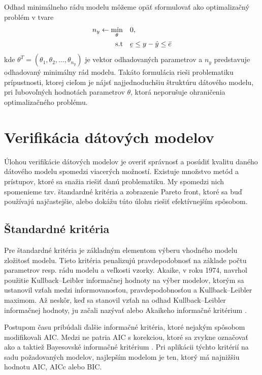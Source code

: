 Odhad minimálneho rádu modelu môžeme opäť sformulovať ako optimalizačný problém v tvare
\begin{equation}
	\begin{split}
		n_y \leftarrow \min_{\theta} & \quad 0, \\
		\text{s.t} & \quad \ubar{e} \leq y - \hat{y} \leq \bar{e}
	\end{split}
\end{equation}
kde $ \theta^T = (\theta_1, \theta_2, \dots, \theta_{n_y}) $ je vektor odhadovaných parametrov a $ n_y $ predstavuje odhadovaný minimálny rád modelu. Takáto formulácia rieši problematiku prípustnosti, ktorej cieľom je nájsť najjednoduchšiu štruktúru dátového modelu, pri ľubovoľných hodnotách parametrov $ \theta $, ktorá neporušuje ohraničenia optimalizačného problému.  

\section{Verifikácia dátových modelov}
Úlohou verifikácie dátových modelov je overiť správnosť a posúdiť kvalitu daného dátového modelu spomedzi viacerých možností. Existuje množstvo metód a prístupov, ktoré sa snažia riešiť danú problematiku. My spomedzi nich spomenieme tzv. štandardné kritéria a zobrazenie Pareto front, ktoré sa buď používajú najčastejšie, alebo dokážu túto úlohu riešiť efektívnejším spôsobom.

\subsection{Štandardné kritéria}
Pre štandardné kritéria je základným elementom výberu vhodného modelu zložitosť modelu. Tieto kritéria penalizujú pravdepodobnosť na základe počtu parametrov resp. rádu modelu a veľkosti vzorky. Akaike, v roku 1974, navrhol použitie Kullback–Leibler informačnej hodnoty na výber modelov, ktorým sa ustanovil vzťah medzi informovanosťou, pravdepodobnosťou a Kullback–Leibler maximom. Až neskôr, keď sa stanovil vzťah na odhad  Kullback–Leibler informačnej hodnoty, ju začali nazývať  alebo Akaikeho informačné kritérium  \cite{emiliano:stand_crit:2014}. 

Postupom času pribúdali ďalšie informačné kritéria, ktoré nejakým spôsobom modifikovali AIC. Medzi ne patria AIC s korekciou, ktoré sa zvykne označovať ako  a taktiež Bayesovské informačné kritérium . Pri aplikácii týchto kritérií na sadu požadovaných modelov, najlepším modelom je ten, ktorý má najnižšiu hodnotu AIC, AICc alebo BIC.

